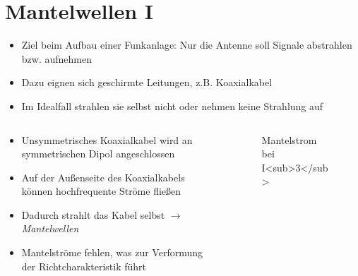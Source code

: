 
\section{Mantelwellen I}
\label{section:mantelwellen_1}
\begin{frame}%
\begin{itemize}
  \item Ziel beim Aufbau einer Funkanlage: Nur die Antenne soll Signale abstrahlen bzw. aufnehmen
  \item Dazu eignen sich geschirmte Leitungen, z.B. Koaxialkabel
  \item Im Idealfall strahlen sie selbst nicht oder nehmen keine Strahlung auf
  \end{itemize}
\end{frame}

\begin{frame}
\begin{columns}
    \begin{column}{0.48\textwidth}
    \begin{itemize}
  \item Unsymmetrisches Koaxialkabel wird an symmetrischen Dipol angeschlossen
  \item Auf der Außenseite des Koaxialkabels können hochfrequente Ströme fließen
  \item Dadurch strahlt das Kabel selbst $\rightarrow$ \emph{Mantelwellen}
  \item Mantelströme fehlen, was zur Verformung der Richtcharakteristik führt
  \end{itemize}

    \end{column}
   \begin{column}{0.48\textwidth}
       
\begin{figure}
    \caption{\scriptsize Mantelstrom bei I<sub>3</sub>}
    \label{e_mantelwelle_effekt}
\end{figure}


   \end{column}
\end{columns}

\end{frame}


